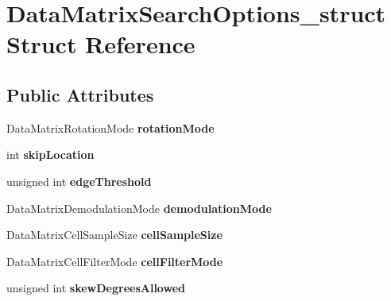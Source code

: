\hypertarget{structDataMatrixSearchOptions__struct}{\section{\-Data\-Matrix\-Search\-Options\-\_\-struct \-Struct \-Reference}
\label{structDataMatrixSearchOptions__struct}
}
\subsection*{\-Public \-Attributes}
\begin{DoxyCompactItemize}
\item 
\hypertarget{structDataMatrixSearchOptions__struct_a49f7165b87b3466564152ebcdbc84b78}{\-Data\-Matrix\-Rotation\-Mode {\bfseries rotation\-Mode}}\label{structDataMatrixSearchOptions__struct_a49f7165b87b3466564152ebcdbc84b78}

\item 
\hypertarget{structDataMatrixSearchOptions__struct_abec5b5f12b525e9bd7f35256123e5f8d}{int {\bfseries skip\-Location}}\label{structDataMatrixSearchOptions__struct_abec5b5f12b525e9bd7f35256123e5f8d}

\item 
\hypertarget{structDataMatrixSearchOptions__struct_aa242e47abd086d71ac3f51d7d39723f6}{unsigned int {\bfseries edge\-Threshold}}\label{structDataMatrixSearchOptions__struct_aa242e47abd086d71ac3f51d7d39723f6}

\item 
\hypertarget{structDataMatrixSearchOptions__struct_a3ea3aa3a6229d0d60ce6d474c67ca7e3}{\-Data\-Matrix\-Demodulation\-Mode {\bfseries demodulation\-Mode}}\label{structDataMatrixSearchOptions__struct_a3ea3aa3a6229d0d60ce6d474c67ca7e3}

\item 
\hypertarget{structDataMatrixSearchOptions__struct_a35947441697d09b929ac261e410c16e1}{\-Data\-Matrix\-Cell\-Sample\-Size {\bfseries cell\-Sample\-Size}}\label{structDataMatrixSearchOptions__struct_a35947441697d09b929ac261e410c16e1}

\item 
\hypertarget{structDataMatrixSearchOptions__struct_adb0891296c12476b121b77ef26904511}{\-Data\-Matrix\-Cell\-Filter\-Mode {\bfseries cell\-Filter\-Mode}}\label{structDataMatrixSearchOptions__struct_adb0891296c12476b121b77ef26904511}

\item 
\hypertarget{structDataMatrixSearchOptions__struct_a14bf0dbe29aec9cf8d87705d831884b3}{unsigned int {\bfseries skew\-Degrees\-Allowed}}\label{structDataMatrixSearchOptions__struct_a14bf0dbe29aec9cf8d87705d831884b3}


\end{DoxyCompactItemize}
